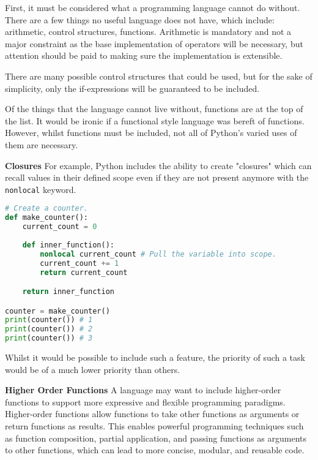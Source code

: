 \documentclass{l4proj}
\begin{document}
First, it must be considered what a programming language cannot do without.
There are a few things no useful language does not have, which include: arithmetic, control structures, functions.
Arithmetic is mandatory and not a major constraint as the base implementation of operators will be necessary, but attention should be paid to making sure the implementation is extensible.

There are many possible control structures that could be used, but for the sake of simplicity, only the if-expressions will be guaranteed to be included. 

Of the things that the language cannot live without, functions are at the top of the list.
It would be ironic if a functional style language was bereft of functions.
However, whilst functions must be included, not all of Python's varied uses of them are necessary.

\textbf{Closures}
For example, Python includes the ability to create "closures" which can recall values in their defined scope even if they are not present anymore with the \texttt{nonlocal} keyword.

\begin{lstlisting}[language=Python, caption={An example of a closure in Python. See the use of the 'nonlocal' keyword to pull the surrounding defintion of 'current\_count' into the scope of 'inner\_function'.}, label={lst:py-closure}]
# Create a counter.
def make_counter():
    current_count = 0
    
    def inner_function():
        nonlocal current_count # Pull the variable into scope.
        current_count += 1
        return current_count

    return inner_function

counter = make_counter()
print(counter()) # 1
print(counter()) # 2
print(counter()) # 3
\end{lstlisting}

Whilst it would be possible to include such a feature, the priority of such a task would be of a much lower priority than others.

\textbf{Higher Order Functions}
A language may want to include higher-order functions to support more expressive and flexible programming paradigms. 
Higher-order functions allow functions to take other functions as arguments or return functions as results.
This enables powerful programming techniques such as function composition, partial application, and passing functions as arguments to other functions, which can lead to more concise, modular, and reusable code.
\end{document}
